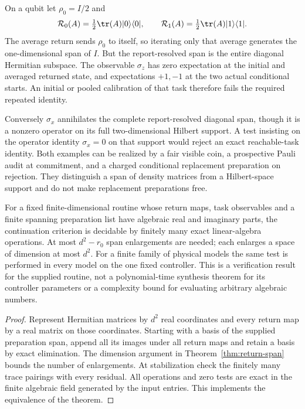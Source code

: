 \begin{example}\label{ex:return-span}
On a qubit let $\rho_0=I/2$ and
\[
 \mathcal R_0(A)=\tfrac12\tr(A)|0\rangle\langle0|,
 \qquad
 \mathcal R_1(A)=\tfrac12\tr(A)|1\rangle\langle1|.
\]
The average return sends $\rho_0$ to itself, so iterating only that average generates the one-dimensional span of $I$. But the report-resolved span is the entire diagonal Hermitian subspace. The observable $\sigma_z$ has zero expectation at the initial and averaged returned state, and expectations $+1,-1$ at the two actual conditional starts. An initial or pooled calibration of that task therefore fails the required repeated identity.

Conversely $\sigma_x$ annihilates the complete report-resolved diagonal span, though it is a nonzero operator on its full two-dimensional Hilbert support. A test insisting on the operator identity $\sigma_x=0$ on that support would reject an exact reachable-task identity. Both examples can be realized by a fair visible coin, a prospective Pauli audit at commitment, and a charged conditional replacement preparation on rejection. They distinguish a span of density matrices from a Hilbert-space support and do not make replacement preparations free.
\end{example}

\begin{proposition}\label{prop:return-arithmetic}
For a fixed finite-dimensional routine whose return maps, task observables and a finite spanning preparation list have algebraic real and imaginary parts, the continuation criterion is decidable by finitely many exact linear-algebra operations. At most $d^2-r_0$ span enlargements are needed; each enlarges a space of dimension at most $d^2$. For a finite family of physical models the same test is performed in every model on the one fixed controller. This is a verification result for the supplied routine, not a polynomial-time synthesis theorem for its controller parameters or a complexity bound for evaluating arbitrary algebraic numbers.
\end{proposition}
\begin{proof}
Represent Hermitian matrices by $d^2$ real coordinates and every return map by a real matrix on those coordinates. Starting with a basis of the supplied preparation span, append all its images under all return maps and retain a basis by exact elimination. The dimension argument in Theorem~\ref{thm:return-span} bounds the number of enlargements. At stabilization check the finitely many trace pairings with every residual. All operations and zero tests are exact in the finite algebraic field generated by the input entries. This implements the equivalence of the theorem.
\end{proof}

